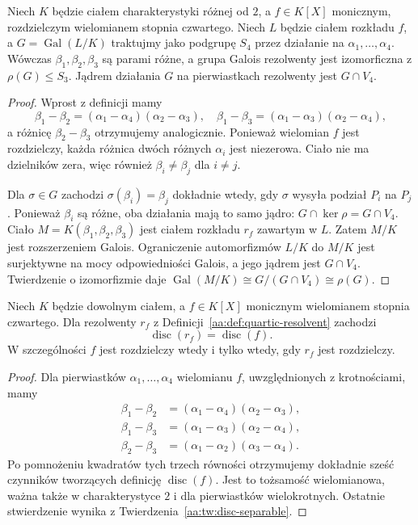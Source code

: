 \begin{twierdzenie}\label{aa:tw:quartic-resolvent-action}
Niech $K$ będzie ciałem charakterystyki różnej od $2$,
a $f\in K[X]$ monicznym, rozdzielczym wielomianem stopnia czwartego.
Niech $L$ będzie ciałem rozkładu $f$, a $G=\operatorname{Gal}(L/K)$
traktujmy jako podgrupę $S_4$ przez działanie na
$\alpha_1,\ldots,\alpha_4$. Wówczas $\beta_1,\beta_2,\beta_3$
są parami różne, a grupa Galois rezolwenty jest izomorficzna
z $\rho(G)\le S_3$. Jądrem działania $G$ na pierwiastkach
rezolwenty jest $G\cap V_4$.
\end{twierdzenie}
\begin{proof}
Wprost z definicji mamy
\[
 \beta_1-\beta_2=(\alpha_1-\alpha_4)(\alpha_2-\alpha_3),\quad
 \beta_1-\beta_3=(\alpha_1-\alpha_3)(\alpha_2-\alpha_4),
\]
a różnicę $\beta_2-\beta_3$ otrzymujemy analogicznie.
Ponieważ wielomian $f$ jest rozdzielczy, każda różnica
dwóch różnych $\alpha_i$ jest niezerowa. Ciało nie ma dzielników
zera, więc również $\beta_i\ne\beta_j$ dla $i\ne j$.

Dla $\sigma\in G$ zachodzi $\sigma(\beta_i)=\beta_j$ dokładnie
wtedy, gdy $\sigma$ wysyła podział $P_i$ na $P_j$.
Ponieważ $\beta_i$ są różne, oba działania mają to samo jądro:
$G\cap\ker\rho=G\cap V_4$.
Ciało $M=K(\beta_1,\beta_2,\beta_3)$ jest ciałem rozkładu
$r_f$ zawartym w $L$. Zatem $M/K$ jest rozszerzeniem Galois.
Ograniczenie automorfizmów $L/K$ do $M/K$ jest surjektywne
na mocy odpowiedniości Galois, a jego jądrem jest $G\cap V_4$.
Twierdzenie o izomorfizmie daje
$\operatorname{Gal}(M/K)\cong G/(G\cap V_4)\cong\rho(G)$.
\end{proof}

\begin{wniosek}\label{aa:wn:quartic-resolvent-disc}
Niech $K$ będzie dowolnym ciałem, a $f\in K[X]$ monicznym
wielomianem stopnia czwartego. Dla rezolwenty $r_f$ z
Definicji~\ref{aa:def:quartic-resolvent} zachodzi
\[
\operatorname{disc}(r_f)=\operatorname{disc}(f).
\]
W szczególności $f$ jest rozdzielczy wtedy i tylko wtedy,
gdy $r_f$ jest rozdzielczy.
\end{wniosek}
\begin{proof}
Dla pierwiastków $\alpha_1,\ldots,\alpha_4$ wielomianu $f$,
uwzględnionych z krotnościami, mamy
\[
\begin{aligned}
\beta_1-\beta_2&=(\alpha_1-\alpha_4)(\alpha_2-\alpha_3),\\
\beta_1-\beta_3&=(\alpha_1-\alpha_3)(\alpha_2-\alpha_4),\\
\beta_2-\beta_3&=(\alpha_1-\alpha_2)(\alpha_3-\alpha_4).
\end{aligned}
\]
Po pomnożeniu kwadratów tych trzech równości otrzymujemy
dokładnie sześć czynników tworzących definicję
$\operatorname{disc}(f)$. Jest to tożsamość wielomianowa,
ważna także w charakterystyce $2$ i dla pierwiastków
wielokrotnych. Ostatnie stwierdzenie wynika z
Twierdzenia~\ref{aa:tw:disc-separable}.
\end{proof}

